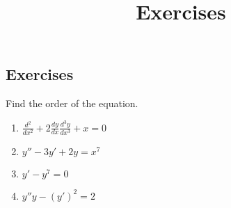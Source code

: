 \documentclass{ximera}
\title{Exercises} \license{CC BY-NC-SA 4.0}
\begin{document}
\begin{abstract}
\end{abstract}
\maketitle

\begin{onlineOnly}
\section*{Exercises}
\end{onlineOnly}

\begin{problem}\label{exer:1.2.1}
Find the order of the   equation.
\begin{enumerate}
\item  $\frac{d^2}{dx^2}+2\frac{dy}{dx}\frac{d^3y}{dx^3}+x=0$
\item    $y''-3y'+2y=x^7$
\item   $y'-y^7=0$
\item   $y''y-(y')^2=2$
\end{enumerate}
\end{problem}
\end{document}
